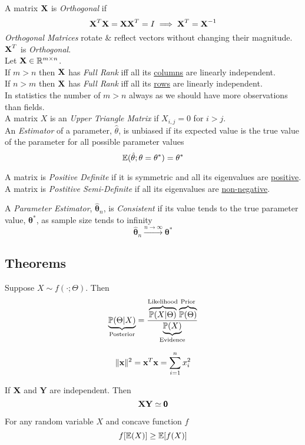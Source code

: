\documentclass[11pt,a4paper]{article}
\begin{document}
A matrix $\textbf{X}$ is \textit{Orthogonal} if
$$\textbf{X}^T\textbf{X}=\textbf{X}\textbf{X}^T=I\implies\textbf{X}^T=\textbf{X}^{-1}$$
\textit{Orthogonal Matrices} rotate \& reflect vectors without changing their magnitude.\\
\nb $\textbf{X}^T$ is \textit{Orthogonal}.\\

Let $\textbf{X}\in\mathbb{R}^{m\times n}$.\\
If $m>n$ then $\textbf{X}$ has \textit{Full Rank} iff all its \underline{columns} are linearly independent.\\
If $n>m$ then $\textbf{X}$ has \textit{Full Rank} iff all its \underline{rows} are linearly independent.\\
\nb In statistics the number of $m>n$ always as we should have more observations than fields.\\

A matrix $X$ is an \textit{Upper Triangle Matrix} if $X_{i,j}=0$ for $i>j$.\\

An \textit{Estimator} of a parameter, $\hat\theta$, is unbiased if its expected value is the true value of the parameter for all possible parameter values
$$\mathbb{E}(\hat\theta;\theta=\theta^*)=\theta^*$$


A matrix is \textit{Positive Definite} if it is symmetric and all its eigenvalues are \underline{positive}.\\

A matrix is \textit{Postitive Semi-Definite} if all its eigenvalues are \underline{non-negative}.


A \textit{Parameter Estimator}, $\hat{\pmb\theta}_n$, is \textit{Consistent} if its value tends to the true parameter value, $\pmb\theta^*$, as sample size tends to infinity
$$\hat{\pmb\theta}_n\overset{n\to\infty}{\longrightarrow}\pmb\theta^*$$

\subsection{Theorems}

Suppose $X\sim f(\cdot;\Theta)$. Then
$$\underbrace{\mathbb{P}(\Theta|X)}_\text{Posterior}=\frac{\overbrace{\mathbb{P}(X|\Theta)}^\text{Likelihood}\overbrace{\mathbb{P}(\Theta)}^\text{Prior}}{\underbrace{\mathbb{P}(X)}_\text{Evidence}}$$

$$\|\textbf{x}\|^2=\textbf{x}^T\textbf{x}=\sum_{i=1}^nx_i^2$$

\theorem{}
If $\textbf{X}$ and $\textbf{Y}$ are independent. Then
$$\textbf{X}\textbf{Y}\simeq\pmb0$$

For any random variable $X$ and concave function $f$
$$f[\mathbb{E}(X)]\geq\mathbb{E}[f(X)]$$
\end{document}

